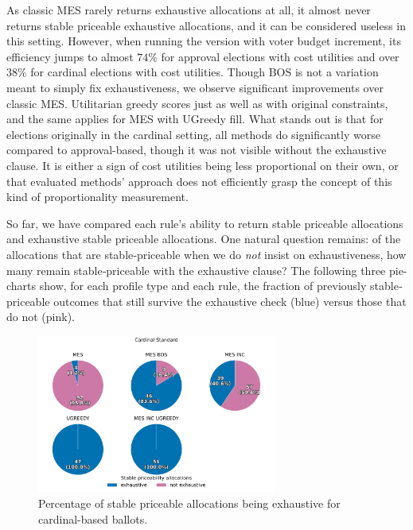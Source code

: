 As classic MES rarely returns exhaustive allocations at all, it almost never returns stable priceable exhaustive allocations, and it can be considered useless in this setting. However, when running the version with voter budget increment, its efficiency jumps to almost $74\%$ for approval elections with cost utilities and over $38\%$ for cardinal elections with cost utilities. Though BOS is not a variation meant to simply fix exhaustiveness, we observe significant improvements over classic MES. Utilitarian greedy scores just as well as with original constraints, and the same applies for MES with UGreedy fill. What stands out is that for elections originally in the cardinal setting, all methods do significantly worse compared to approval-based, though it was not visible without the exhaustive clause. It is either a sign of cost utilities being less proportional on their own, or that evaluated methods' approach does not efficiently grasp the concept of this kind of proportionality measurement.

So far, we have compared each rule’s ability to return stable priceable allocations and exhaustive stable priceable allocations. One natural question remains: of the allocations that are stable‐priceable when we do \emph{not} insist on exhaustiveness, how many remain stable‐priceable with the exhaustive clause? The following three pie-charts show, for each profile type and each rule, the fraction of previously stable‐priceable outcomes that still survive the exhaustive check (blue) versus those that do not (pink).
\begin{figure}[H]         
  \centering              
  \includegraphics[width=0.7\textwidth]{figures/plots/cardinal-standard/cardinal_standard_stability_pies.png}
  \caption{Percentage of stable priceable allocations being exhaustive for cardinal-based ballots.}
  \label{fig:myplot}
\end{figure}

